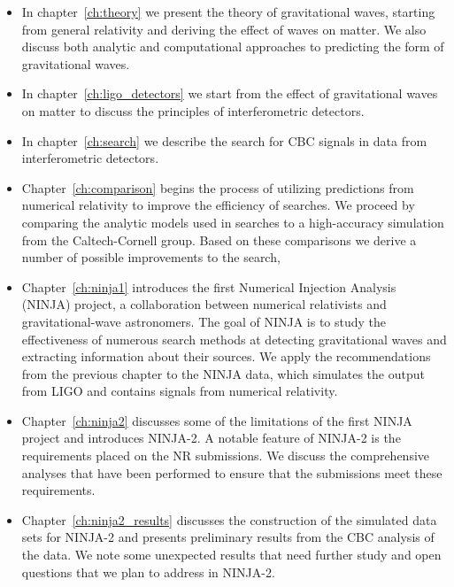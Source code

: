 \begin{itemize}

\item In chapter~\ref{ch:theory} we present the theory of
gravitational waves, starting from general relativity and deriving
the effect of waves on matter.  We also discuss both analytic and
computational approaches to predicting the form of gravitational
waves.

\item In chapter~\ref{ch:ligo_detectors} we start from the effect of
gravitational waves on matter to discuss the principles of
interferometric detectors. 

\item In chapter~\ref{ch:search} we describe the search for CBC
signals in data from interferometric detectors.

\item Chapter~\ref{ch:comparison} begins the process of utilizing
predictions from numerical relativity to improve the efficiency of
searches.  We proceed by comparing the analytic models used in
searches to a high-accuracy simulation from the Caltech-Cornell group.
Based on these comparisons we derive a number of possible improvements
to the search,

\item Chapter~\ref{ch:ninja1} introduces the first Numerical Injection
Analysis (NINJA) project, a collaboration between numerical
relativists and gravitational-wave astronomers.  The goal of NINJA is
to study the effectiveness of numerous search methods at detecting
gravitational waves and extracting information about their sources.
We apply the recommendations from the previous chapter to the NINJA
data, which simulates the output from LIGO and contains signals from
numerical relativity.

\item Chapter~\ref{ch:ninja2} discusses some of the limitations of the
first NINJA project and introduces NINJA-2.  A notable feature of
NINJA-2 is the requirements placed on the NR submissions.  We discuss 
the comprehensive analyses that have been performed to ensure that the
submissions meet these requirements.

\item Chapter~\ref{ch:ninja2_results} discusses the construction of the
simulated data sets for NINJA-2 and presents preliminary results from
the CBC analysis of the data.  We note some unexpected results that
need further study and open questions that we plan to address in
NINJA-2.


\end{itemize}
